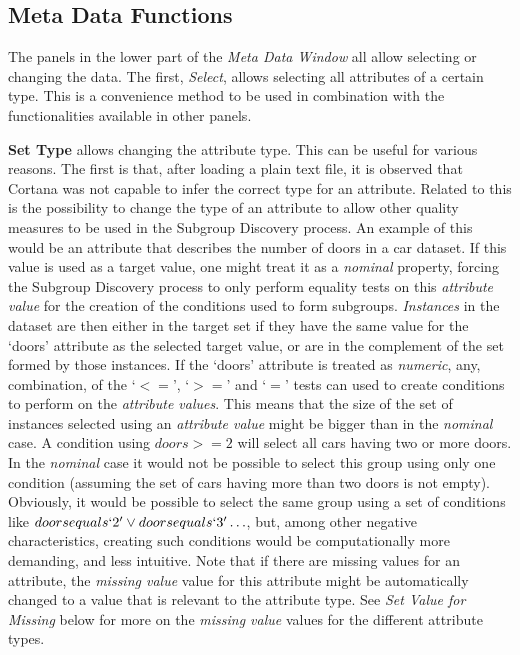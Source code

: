 \documentclass{article}
\begin{document}
\subsection{Meta Data Functions}
\label{meta-data-window:meta-data-functions}
The panels in the lower part of the \emph{Meta Data Window} all allow selecting or changing the data.
The first, \emph{Select}, allows selecting all attributes of a certain type.
This is a convenience method to be used in combination with the functionalities available in other panels.

\textbf{Set Type} allows changing the attribute type.
This can be useful for various reasons.
The first is that, after loading a plain text file, it is observed that Cortana was not capable to infer the correct type for an attribute.
Related to this is the possibility to change the type of an attribute to allow other quality measures to be used in the Subgroup Discovery process.
An example of this would be an attribute that describes the number of doors in a car dataset.
If this value is used as a target value, one might treat it as a \emph{nominal} property, forcing the Subgroup Discovery process to only perform equality tests on this \emph{attribute value} for the creation of the conditions used to form subgroups.
\emph{Instances} in the dataset are then either in the target set if they have the same value for the `doors' attribute as the selected target value, or are in the complement of the set formed by those instances.
If the `doors' attribute is treated as \emph{numeric}, any, combination, of the `$<=$', `$>=$' and `$=$' tests can used to create conditions to perform on the \emph{attribute values}.
This means that the size of the set of instances selected using an \emph{attribute value} might be bigger than in the \emph{nominal} case.
A condition using $doors >= 2$ will select all cars having two or more doors.
In the \emph{nominal} case it would not be possible to select this group using only one condition (assuming the set of cars having more than two doors is not empty).
Obviously, it would be possible to select the same group using a set of conditions like $doors equals `2' \vee doors equals `3' \ldots$, but, among other negative characteristics, creating such conditions would be computationally more demanding, and less intuitive.
Note that if there are missing values for an attribute, the \emph{missing value} value for this attribute might be automatically changed to a value that is relevant to the attribute type.
See \emph{Set Value for Missing} below for more on the \emph{missing value} values for the different attribute types.
\end{document}

